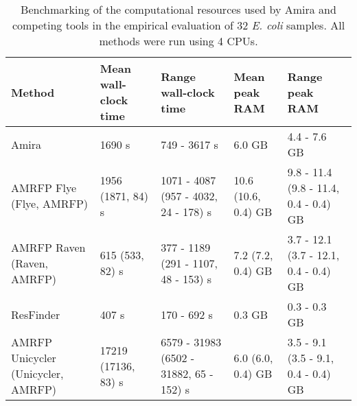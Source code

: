 \begin{sidewaystable}[ht]
\centering
\caption{Benchmarking of the computational resources used by Amira and competing tools in the empirical evaluation of 32 \textit{E. coli} samples. All methods were run using 4 CPUs.}
\begin{tabular}{|l|l|l|l|l|}
\hline
\textbf{Method} & \textbf{Mean wall-clock time} & \textbf{Range wall-clock time} & \textbf{Mean peak RAM} & \textbf{Range peak RAM} \\ \hline
Amira & 1690 s & 749 - 3617 s & 6.0 GB & 4.4 - 7.6 GB \\ \hline
AMRFP Flye (Flye, AMRFP) & 1956 (1871, 84) s & 1071 - 4087 (957 - 4032, 24 - 178) s & 10.6 (10.6, 0.4) GB & 9.8 - 11.4 (9.8 - 11.4, 0.4 - 0.4) GB \\ \hline
AMRFP Raven (Raven, AMRFP) & 615 (533, 82) s & 377 - 1189 (291 - 1107, 48 - 153) s & 7.2 (7.2, 0.4) GB & 3.7 - 12.1 (3.7 - 12.1, 0.4 - 0.4) GB \\ \hline
ResFinder & 407 s & 170 - 692 s & 0.3 GB & 0.3 - 0.3 GB \\ \hline
AMRFP Unicycler (Unicycler, AMRFP) & 17219 (17136, 83) s & 6579 - 31983 (6502 - 31882, 65 - 152) s & 6.0 (6.0, 0.4) GB & 3.5 - 9.1 (3.5 - 9.1, 0.4 - 0.4) GB \\ \hline
\end{tabular}
\label{supptable:2}
\end{sidewaystable}
